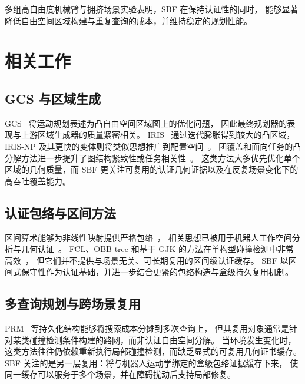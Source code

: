 \documentclass[journal]{IEEEtran}
\begin{document}
多组高自由度机械臂与拥挤场景实验表明，SBF 在保持认证性的同时，
能够显著降低自由空间区域构建与重复查询的成本，并维持稳定的规划性能。

\section{相关工作}
\label{sec:related}

\subsection{GCS 与区域生成}

GCS~\cite{marcucci2024motion} 将运动规划表述为凸自由空间区域图上的优化问题，
因此最终规划器的表现与上游区域生成器的质量紧密相关。
IRIS~\cite{deits2015computing} 通过迭代膨胀得到较大的凸区域，
IRIS-NP 及其更快的变体则将类似思想推广到配置空间~\cite{werner2024fast,werner2024irisze}。
团覆盖和面向任务的凸分解方法进一步提升了图结构紧致性或任务相关性~\cite{amice2024clique,werner2024vcd}。
这类方法大多优先优化单个区域的几何质量，而 SBF 更关注可复用的认证几何证据以及在反复场景变化下的高吞吐覆盖能力。

\subsection{认证包络与区间方法}

区间算术能够为非线性映射提供严格包络~\cite{moore2009introduction,jaulin2001applied}，
相关思想已被用于机器人工作空间分析与几何认证~\cite{merlet2004solving,merlet2006interval}。
FCL、OBB-tree 和基于 GJK 的方法在单构型碰撞检测中非常高效~\cite{pan2012fcl,gottschalk1996obbtree,gilbert1988fast}，
但它们并不提供与场景无关、可长期复用的区间级认证缓存。
SBF 以区间式保守性作为认证基础，并进一步结合更紧的包络构造与盒级持久复用机制。

\subsection{多查询规划与跨场景复用}

PRM~\cite{kavraki1996probabilistic} 等持久化结构能够将搜索成本分摊到多次查询上，
但其复用对象通常是针对某类碰撞检测条件构建的路网，而非认证自由空间分解。
当环境发生变化时，这类方法往往仍依赖重新执行局部碰撞检测，而缺乏显式的可复用几何证书缓存。
SBF 关注的是另一层复用：将与机器人运动学绑定的盒级包络证据缓存下来，
使同一缓存可以服务于多个场景，并在障碍扰动后支持局部修复。
\end{document}
